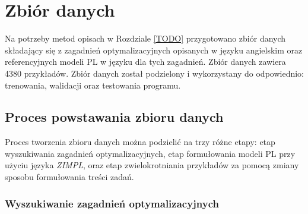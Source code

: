 
\chapter{Zbiór danych}\label{ch:dataset}

Na potrzeby metod opisach w Rozdziale \ref{TODO} przygotowano zbiór danych składający się z zagadnień optymalizacyjnych opisanych w języku angielskim oraz referencyjnych modeli PL w języku  dla tych zagadnień.
Zbiór danych zawiera 4380 przykładów. %
Zbiór danych został podzielony i wykorzystany do odpowiednio: trenowania, walidacji oraz testowania programu. %

\section{Proces powstawania zbioru danych}

Proces tworzenia zbioru danych można podzielić na trzy różne etapy: etap wyszukiwania zagadnień optymalizacyjnych, etap formułowania modeli PL przy użyciu języka \textit{ZIMPL}, oraz etap zwielokrotniania przykładów za pomocą zmiany sposobu formułowania treści zadań. %


\subsection{Wyszukiwanie zagadnień optymalizacyjnych}


